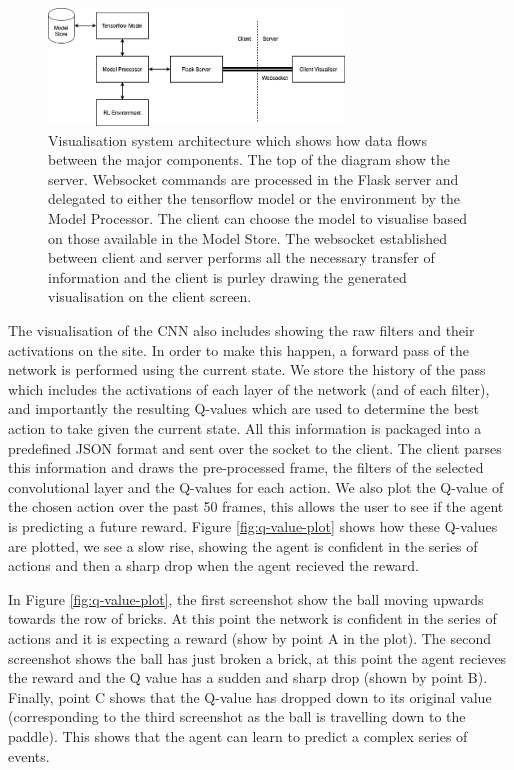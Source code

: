 \begin{figure}[htbp]
	\centering
	\includegraphics[width=0.70\textwidth]{chapters/chapter4/images/VizSystem.png}
	\caption[Visualisation system architecture]{Visualisation system architecture which shows how data flows between the major components. The top of the diagram show the server. Websocket commands are processed in the Flask server and delegated to either the tensorflow model or the environment by the Model Processor. The client can choose the model to visualise based on those available in the Model Store. The websocket established between client and server performs all the necessary transfer of information and the client is purley drawing the generated visualisation on the client screen.
		\label{fig:viz-system-arch}
	}
\end{figure}


The visualisation of the CNN also includes showing the raw filters and their activations on the site. In order to make this happen, a forward pass of the network is performed using the current state. We store the history of the pass which includes the activations of each layer of the network (and of each filter), and importantly the resulting Q-values which are used to determine the best action to take given the current state. All this information is packaged into a predefined JSON format and sent over the socket to the client. The client parses this information and draws the pre-processed frame, the filters of the selected convolutional layer and the Q-values for each action. We also plot the Q-value of the chosen action over the past 50 frames, this allows the user to see if the agent is predicting a future reward. Figure \ref{fig:q-value-plot} shows how these Q-values are plotted, we see a slow rise, showing the agent is confident in the series of actions and then a sharp drop when the agent recieved the reward.

In Figure \ref{fig:q-value-plot}, the first screenshot show the ball moving upwards towards the row of bricks. At this point the network is confident in the series of actions and it is expecting a reward (show by point A in the plot). The second screenshot shows the ball has just broken a brick, at this point the agent recieves the reward and the Q value has a sudden and sharp drop (shown by point B). Finally, point C shows that the Q-value has dropped down to its original value (corresponding to the third screenshot as the ball is travelling down to the paddle). This shows that the agent can learn to predict a complex series of events.


